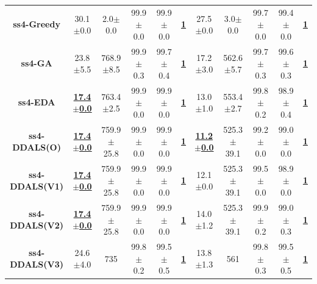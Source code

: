 \documentclass[lettersize,journal]{IEEEtran}
\begin{document}
\begin{table}[!t]
{\begin{tabular}{ccccccccccc}
    \midrule
    {\bfseries ss4-Greedy} &30.1$\pm$0.0&2.0$\pm$0.0 & 99.9$\pm$0.0&99.9$\pm$0.0 &\underline{\bfseries 1} &27.5$\pm$0.0&3.0$\pm$0.0& 99.7$\pm$0.0&99.4$\pm$0.0  &\underline{\bfseries 1} \\
    {\bfseries ss4-GA} &23.8$\pm$5.5&768.9$\pm$8.5 & 99.9$\pm$0.3&99.7$\pm$0.4 &\underline{\bfseries 1} &17.2$\pm$3.0&562.6$\pm$5.7& 99.7$\pm$0.3&99.6$\pm$0.3  &\underline{\bfseries 1} \\
    {\bfseries ss4-EDA} &\underline{\bfseries 17.4$\pm$0.0} &763.4$\pm$2.5 & 99.9$\pm$0.0&99.9$\pm$0.0 &\underline{\bfseries 1} &13.0$\pm$1.0&553.4$\pm$2.7& 99.8$\pm$0.2&98.9$\pm$0.4  &\underline{\bfseries 1} \\
    {\bfseries ss4-DDALS(O)} &\underline{\bfseries 17.4$\pm$0.0} &759.9$\pm$25.8 & 99.9$\pm$0.0&99.9$\pm$0.0 &\underline{\bfseries 1} &\underline{\bfseries 11.2$\pm$0.0} &525.3$\pm$39.1& 99.2$\pm$0.0&99.0$\pm$0.0  &\underline{\bfseries 1} \\
    {\bfseries ss4-DDALS(V1)} &\underline{\bfseries 17.4$\pm$0.0} &759.9$\pm$25.8 & 99.9$\pm$0.0&99.9$\pm$0.0 &\underline{\bfseries 1} &12.1$\pm$0.0&525.3$\pm$39.1& 99.5$\pm$0.0&98.9$\pm$0.0  &\underline{\bfseries 1} \\
    {\bfseries ss4-DDALS(V2)} &\underline{\bfseries 17.4$\pm$0.0} &759.9$\pm$25.8 & 99.9$\pm$0.0&99.9$\pm$0.0 &\underline{\bfseries 1} &14.0$\pm$1.2&525.3$\pm$39.1& 99.9$\pm$0.2&99.0$\pm$0.3  &\underline{\bfseries 1} \\
    {\bfseries ss4-DDALS(V3)} &24.6$\pm$4.0&735 & 99.8$\pm$0.2&99.5$\pm$0.5 &\underline{\bfseries 1} &13.8$\pm$1.3&561& 99.8$\pm$0.3&99.5$\pm$0.5  &\underline{\bfseries 1} \\
    

\end{tabular}}
\end{table}
\end{document}
